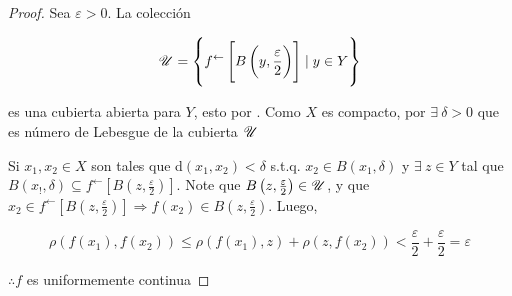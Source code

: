 \begin{proof}
    Sea $\varepsilon > 0$. La colección 

    $$\mathscr{U} = \left\{ f^\leftarrow \left[B\left( y, \frac{\varepsilon}{2}\right) \right] \mid y \in Y \right\}$$

    es una cubierta abierta para $Y$, esto por . Como $X$ es compacto, por  $\exists \: \delta > 0$ que es número de Lebesgue de la cubierta $\mathscr{U}$

    Si $x_1, x_2 \in X$ son tales que d$(x_1,x_2) < \delta$ s.t.q. $x_2 \in B(x_1,\delta)$ y $\exists \: z \in Y$ tal que  $B(x_!, \delta) \subseteq f^\leftarrow \left[B\left( z, \frac{\varepsilon}{2}\right) \right]$. Note que $B\left( z, \frac{\varepsilon}{2}\right) \in \mathscr{U}$, y que $x_2 \in f^\leftarrow \left[B\left( z, \frac{\varepsilon}{2}\right) \right] \Rightarrow f(x_2) \in B\left( z, \frac{\varepsilon}{2}\right)$. Luego,

    $$\rho(f(x_1),f(x_2)) \leqslant \rho(f(x_1),z) + \rho(z,f(x_2)) < \frac{\varepsilon}{2}+ \frac{\varepsilon}{2} = \varepsilon$$

    $\therefore f$ es uniformemente continua
\end{proof}